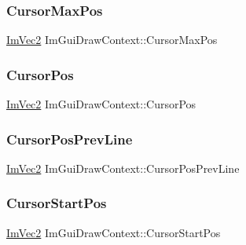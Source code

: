 \subsubsection{\texorpdfstring{Cursor\+Max\+Pos}{CursorMaxPos}}
{\footnotesize\ttfamily \hyperlink{struct_im_vec2}{Im\+Vec2} Im\+Gui\+Draw\+Context\+::\+Cursor\+Max\+Pos}

\hypertarget{struct_im_gui_draw_context_a1f566246492e0995b5182de23633dc9a}{}\label{struct_im_gui_draw_context_a1f566246492e0995b5182de23633dc9a} 
\subsubsection{\texorpdfstring{Cursor\+Pos}{CursorPos}}
{\footnotesize\ttfamily \hyperlink{struct_im_vec2}{Im\+Vec2} Im\+Gui\+Draw\+Context\+::\+Cursor\+Pos}

\hypertarget{struct_im_gui_draw_context_adf64144a8421a21d7350d0452739eca2}{}\label{struct_im_gui_draw_context_adf64144a8421a21d7350d0452739eca2} 
\subsubsection{\texorpdfstring{Cursor\+Pos\+Prev\+Line}{CursorPosPrevLine}}
{\footnotesize\ttfamily \hyperlink{struct_im_vec2}{Im\+Vec2} Im\+Gui\+Draw\+Context\+::\+Cursor\+Pos\+Prev\+Line}

\hypertarget{struct_im_gui_draw_context_aef16fef5d6781908d806479fd37f393f}{}\label{struct_im_gui_draw_context_aef16fef5d6781908d806479fd37f393f} 
\subsubsection{\texorpdfstring{Cursor\+Start\+Pos}{CursorStartPos}}
{\footnotesize\ttfamily \hyperlink{struct_im_vec2}{Im\+Vec2} Im\+Gui\+Draw\+Context\+::\+Cursor\+Start\+Pos}

\hypertarget{struct_im_gui_draw_context_a30473e3e4b3eeba6c8d1acdaaedecba9}{}\label{struct_im_gui_draw_context_a30473e3e4b3eeba6c8d1acdaaedecba9} 
